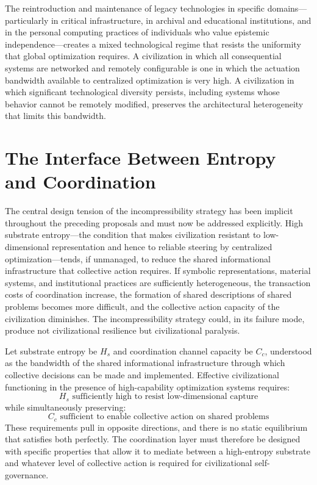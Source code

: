 \documentclass[12pt]{article}
\begin{document}
The reintroduction and maintenance of legacy technologies in specific domains---particularly in critical infrastructure, in archival and educational institutions, and in the personal computing practices of individuals who value epistemic independence---creates a mixed technological regime that resists the uniformity that global optimization requires. A civilization in which all consequential systems are networked and remotely configurable is one in which the actuation bandwidth available to centralized optimization is very high. A civilization in which significant technological diversity persists, including systems whose behavior cannot be remotely modified, preserves the architectural heterogeneity that limits this bandwidth.

\section{The Interface Between Entropy and Coordination}

The central design tension of the incompressibility strategy has been implicit throughout the preceding proposals and must now be addressed explicitly. High substrate entropy---the condition that makes civilization resistant to low-dimensional representation and hence to reliable steering by centralized optimization---tends, if unmanaged, to reduce the shared informational infrastructure that collective action requires. If symbolic representations, material systems, and institutional practices are sufficiently heterogeneous, the transaction costs of coordination increase, the formation of shared descriptions of shared problems becomes more difficult, and the collective action capacity of the civilization diminishes. The incompressibility strategy could, in its failure mode, produce not civilizational resilience but civilizational paralysis.

Let substrate entropy be $H_s$ and coordination channel capacity be $C_c$, understood as the bandwidth of the shared informational infrastructure through which collective decisions can be made and implemented. Effective civilizational functioning in the presence of high-capability optimization systems requires:
\[
H_s \text{ sufficiently high to resist low-dimensional capture}
\]
while simultaneously preserving:
\[
C_c \text{ sufficient to enable collective action on shared problems}
\]
These requirements pull in opposite directions, and there is no static equilibrium that satisfies both perfectly. The coordination layer must therefore be designed with specific properties that allow it to mediate between a high-entropy substrate and whatever level of collective action is required for civilizational self-governance.
\end{document}
